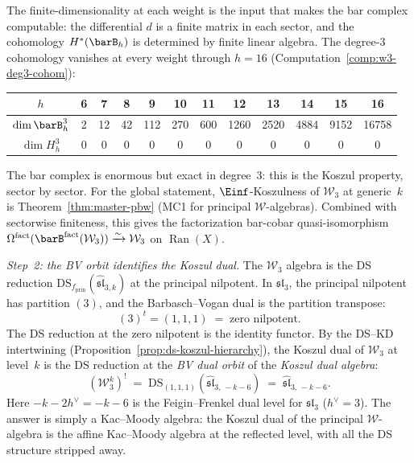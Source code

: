 The finite-dimensionality at each weight is the input that makes the
bar complex computable: the differential $d$ is a finite matrix
in each sector, and the cohomology $H^*(\barB_h)$ is determined by
finite linear algebra.  The degree-$3$ cohomology vanishes
at every weight through $h = 16$
(Computation~\ref{comp:w3-deg3-cohom}):
\begin{center}
\renewcommand{\arraystretch}{1.1}
\begin{tabular}{c|ccccccccccc}
$h$ & 6 & 7 & 8 & 9 & 10 & 11 & 12 & 13 & 14 & 15 & 16 \\
\hline
$\dim \barB^3_h$ & 2 & 12 & 42 & 112 & 270 & 600 & 1260 & 2520 & 4884 & 9152 & 16758 \\
$\dim H^3_h$ & 0 & 0 & 0 & 0 & 0 & 0 & 0 & 0 & 0 & 0 & 0
\end{tabular}
\end{center}
The bar complex is enormous but exact in degree~$3$: this is the
Koszul property, sector by sector.  For the global statement,
$\Einf$-Koszulness of $\mathcal{W}_3$ at generic~$k$ is
Theorem~\ref{thm:master-pbw} (MC1 for principal $\mathcal{W}$-algebras).
Combined with sectorwise finiteness, this gives the factorization
bar-cobar quasi-isomorphism
$\Omega^{\mathrm{fact}}(\barB^{\mathrm{fact}}(\mathcal{W}_3))
\xrightarrow{\sim} \mathcal{W}_3$
on $\operatorname{Ran}(X)$.

\emph{Step~2: the BV orbit identifies the Koszul dual.}
The $\mathcal{W}_3$ algebra is the DS reduction
$\mathrm{DS}_{f_{\mathrm{prin}}}(\widehat{\mathfrak{sl}}_{3,k})$
at the principal nilpotent.  In $\mathfrak{sl}_3$, the principal
nilpotent has partition $(3)$, and the Barbasch--Vogan dual is the
partition transpose:
\[
(3)^t = (1,1,1) \;=\; \text{zero nilpotent.}
\]
The DS reduction at the zero nilpotent is the identity functor.
By the DS--KD intertwining
(Proposition~\ref{prop:ds-koszul-hierarchy}), the Koszul dual
of $\mathcal{W}_3$ at level~$k$ is the DS reduction at the
\emph{BV dual orbit} of the \emph{Koszul dual algebra}:
\begin{equation}\label{eq:w3-kd-explicit}
(\mathcal{W}_3^k)^!
\;=\;
\mathrm{DS}_{(1,1,1)}(\widehat{\mathfrak{sl}}_{3,\,-k-6})
\;=\;
\widehat{\mathfrak{sl}}_{3,\,-k-6}.
\end{equation}
Here $-k - 2h^\vee = -k - 6$ is the Feigin--Frenkel dual level
for $\mathfrak{sl}_3$ ($h^\vee = 3$).  The answer is
simply a Kac--Moody algebra: the Koszul dual of the principal
$\mathcal{W}$-algebra is the affine Kac--Moody algebra at the
reflected level, with all the DS structure stripped away.

